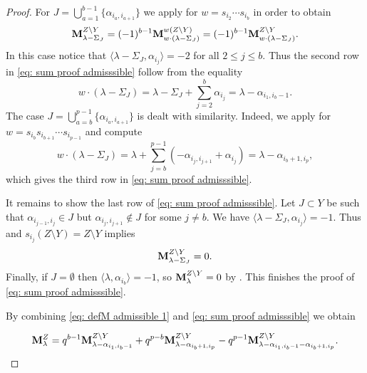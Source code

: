 \begin{proof}
For $J = \bigcup\limits_{a=1}^{b-1} \{\alpha_{i_{a},i_{a+1}}\}$ we apply  for $w=s_{i_{2}}\cdots s_{i_{b}}$ in order to obtain
    \begin{equation}
         \mathbf{M}_{\lambda - \Sigma_{J}}^{Z\setminus Y} =(-1)^{b-1}\mathbf{M}_{w\cdot(\lambda - \Sigma_{J})}^{w(Z\setminus Y)}= (-1)^{b-1}\mathbf{M}_{w\cdot(\lambda - \Sigma_{J})}^{Z\setminus Y}.
    \end{equation}
In this case notice that $\langle\lambda -\Sigma_J,\alpha_{i_j}\rangle =-2$ for all $2\leq j \leq b$. Thus the second row in \eqref{eq: sum proof admisssible} follow from the equality
    \begin{equation}
        w\cdot(\lambda - \Sigma_{J}) = \lambda -\Sigma_J +\sum_{j=2}^b\alpha_{i_j} = \lambda -\alpha_{i_1,i_b-1}. 
    \end{equation}
The case  $J = \bigcup\limits_{a=b}^{p-1} \{\alpha_{i_{a},i_{a+1}}\}$  is dealt with similarity. Indeed, we apply   for 
 $w=s_{i_{b}}s_{i_{b+1}}\cdots s_{i_{p-1}}$ and compute  
\begin{equation}
w\cdot (\lambda-{\Sigma_{J}})  = \lambda + \sum_{j=b}^{p-1} (-\alpha_{i_{j},i_{j+1}} + \alpha_{i_{j}}) = \lambda - \alpha_{i_{b}+1,i_{p}},
\end{equation}
which gives the third row in \eqref{eq: sum proof admisssible}.

It remains to show the last row of  \eqref{eq: sum proof admisssible}. Let $J\subset Y$ be such that $\alpha_{i_{j-1},i_{j}}\in J$ but $\alpha_{i_{j},i_{j+1}} \not \in J$ for some $j\neq b$. We have $\langle\lambda - \Sigma_{J},\alpha_{i_{j}}\rangle = -1$.  Thus  and $s_{i_{j}}(Z\setminus Y) = Z\setminus Y$ implies 
    \begin{equation}
        \mathbf{M}_{\lambda-\Sigma_{J}}^{Z\setminus Y} = 0.
    \end{equation}
   Finally, if  $J=\emptyset$ then $\langle\lambda,\alpha_{i_{b}}\rangle = -1$, so $\mathbf{M}_{\lambda}^{Z\setminus Y} = 0$ by . This finishes the proof of \eqref{eq: sum proof admisssible}. 

By combining \eqref{eq: defM admissible 1} and \eqref{eq: sum proof admisssible} we obtain 

\begin{equation} \label{eq: proof admissible uno}
\mathbf{M}_{\lambda }^{Z}  = 
q^{b-1}\mathbf{M}_{\lambda - \alpha_{i_{1},i_{b}-1}}^{Z\setminus Y}+
    q^{p-b}\mathbf{M}_{\lambda - \alpha_{i_{b}+1,i_{p}}}^{Z\setminus Y} -
     q^{p-1}\mathbf{M}_{\lambda - \alpha_{i_{1},i_{b}-1} -\alpha_{i_{b} +1 , i_{p}}}^{Z\setminus Y}.
\end{equation}


\end{proof}
